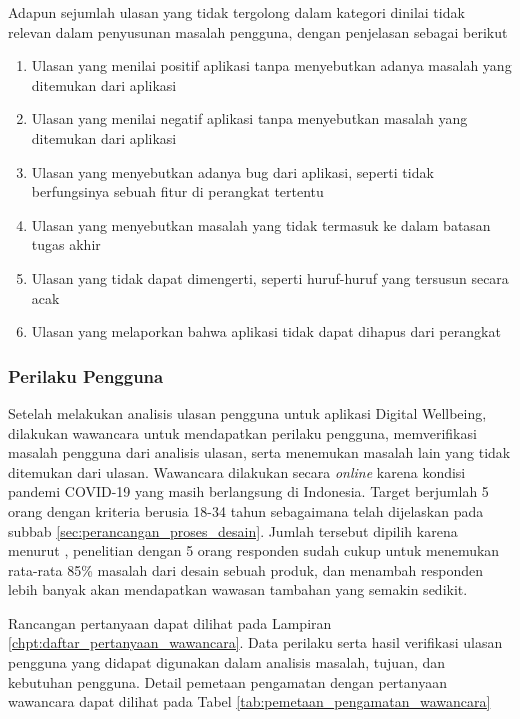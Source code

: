 \FloatBarrier

Adapun sejumlah ulasan yang tidak tergolong dalam kategori dinilai tidak relevan dalam penyusunan masalah pengguna, dengan penjelasan sebagai berikut

\begin{enumerate}
  \item Ulasan yang menilai positif aplikasi tanpa menyebutkan adanya masalah yang ditemukan dari aplikasi
  \item Ulasan yang menilai negatif aplikasi tanpa menyebutkan masalah yang ditemukan dari aplikasi
  \item Ulasan yang menyebutkan adanya bug dari aplikasi, seperti tidak berfungsinya sebuah fitur di perangkat tertentu
  \item Ulasan yang menyebutkan masalah yang tidak termasuk ke dalam batasan tugas akhir
  \item Ulasan yang tidak dapat dimengerti, seperti huruf-huruf yang tersusun secara acak 
  \item Ulasan yang melaporkan bahwa aplikasi tidak dapat dihapus dari perangkat
\end{enumerate}

\subsubsection{Perilaku Pengguna}
Setelah melakukan analisis ulasan pengguna untuk aplikasi Digital Wellbeing, dilakukan wawancara untuk mendapatkan perilaku pengguna, memverifikasi masalah pengguna dari analisis ulasan, serta menemukan masalah lain yang tidak ditemukan dari ulasan. Wawancara dilakukan secara \textit{online} karena kondisi pandemi COVID-19 yang masih berlangsung di Indonesia. Target berjumlah 5 orang dengan kriteria berusia 18-34 tahun sebagaimana telah dijelaskan pada subbab \ref{sec:perancangan_proses_desain}. Jumlah tersebut dipilih karena menurut \textcite{nielsenusabilityproblems}, penelitian dengan 5 orang responden sudah cukup untuk menemukan rata-rata 85\% masalah dari desain sebuah produk, dan menambah responden lebih banyak akan mendapatkan wawasan tambahan yang semakin sedikit.

Rancangan pertanyaan dapat dilihat pada Lampiran \ref{chpt:daftar_pertanyaan_wawancara}. Data perilaku serta hasil verifikasi ulasan pengguna yang didapat digunakan dalam analisis masalah, tujuan, dan kebutuhan pengguna. Detail pemetaan pengamatan dengan pertanyaan wawancara dapat dilihat pada Tabel \ref{tab:pemetaan_pengamatan_wawancara}

